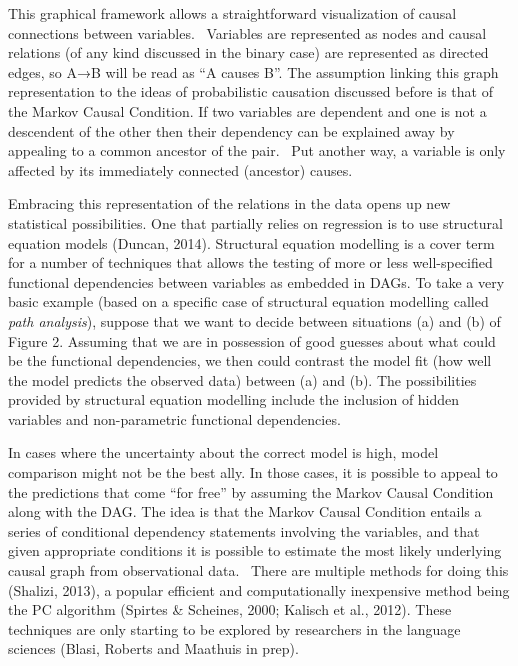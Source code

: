 \documentclass[11pt]{article}
\newenvironment{styleStandard}{\setlength\leftskip{0in}\setlength\rightskip{0in}\setlength\parindent{0in}\setlength\parfillskip{0pt plus 1fil}\setlength\parskip{0in plus 1pt}\writerlistparindent\writerlistleftskip\leavevmode\normalfont\normalsize\writerlistlabel\ignorespaces}{\unskip\vspace{0in plus 1pt}\par}
\newcommand\writerlistleftskip{}
\newcommand\writerlistparindent{}
\newcommand\writerlistlabel{}
\begin{document}
\begin{styleStandard}
This graphical framework allows a straightforward visualization of causal connections between variables. \ Variables are represented as nodes and causal relations (of any kind discussed in the binary case) are represented as directed edges, so A→B will be read as “A causes B”. The assumption linking this graph representation to the ideas of probabilistic causation discussed before is that of the Markov Causal Condition. If two variables are dependent and one is not a descendent of the other then their dependency can be explained away by appealing to a common ancestor of the pair. \ Put another way, a variable is only affected by its immediately connected (ancestor) causes.
\end{styleStandard}


\begin{styleStandard}
Embracing this representation of the relations in the data opens up new statistical possibilities. One that partially relies on regression is to use structural equation models (Duncan, 2014). Structural equation modelling is a cover term for a number of techniques that allows the testing of more or less well-specified functional dependencies between variables as embedded in DAGs. To take a very basic example (based on a specific case of structural equation modelling called \textit{path analysis}), suppose that we want to decide between situations (a) and (b) of Figure 2. Assuming that we are in possession of good guesses about what could be the functional dependencies, we then could contrast the model fit (how well the model predicts the observed data) between (a) and (b). The possibilities provided by structural equation modelling include the inclusion of hidden variables and non-parametric functional dependencies.
\end{styleStandard}


\begin{styleStandard}
In cases where the uncertainty about the correct model is high, model comparison might not be the best ally. In those cases, it is possible to appeal to the predictions that come “for free” by assuming the Markov Causal Condition along with the DAG. The idea is that the Markov Causal Condition entails a series of conditional dependency statements involving the variables, and that given appropriate conditions it is possible to estimate the most likely underlying causal graph from observational data. \ There are multiple methods for doing this (Shalizi, 2013), a popular efficient and computationally inexpensive method being the PC algorithm (Spirtes \& Scheines, 2000; Kalisch et al., 2012). These techniques are only starting to be explored by researchers in the language sciences (Blasi, Roberts and Maathuis in prep).
\end{styleStandard}
\end{document}
